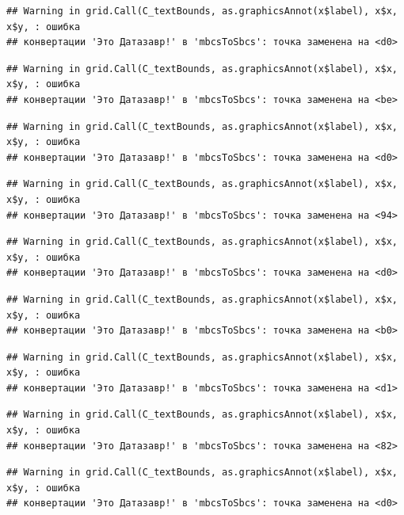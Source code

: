 \documentclass[]{book}
\begin{document}
\begin{verbatim}
## Warning in grid.Call(C_textBounds, as.graphicsAnnot(x$label), x$x, x$y, : ошибка
## конвертации 'Это Датазавр!' в 'mbcsToSbcs': точка заменена на <d0>
\end{verbatim}

\begin{verbatim}
## Warning in grid.Call(C_textBounds, as.graphicsAnnot(x$label), x$x, x$y, : ошибка
## конвертации 'Это Датазавр!' в 'mbcsToSbcs': точка заменена на <be>
\end{verbatim}

\begin{verbatim}
## Warning in grid.Call(C_textBounds, as.graphicsAnnot(x$label), x$x, x$y, : ошибка
## конвертации 'Это Датазавр!' в 'mbcsToSbcs': точка заменена на <d0>
\end{verbatim}

\begin{verbatim}
## Warning in grid.Call(C_textBounds, as.graphicsAnnot(x$label), x$x, x$y, : ошибка
## конвертации 'Это Датазавр!' в 'mbcsToSbcs': точка заменена на <94>
\end{verbatim}

\begin{verbatim}
## Warning in grid.Call(C_textBounds, as.graphicsAnnot(x$label), x$x, x$y, : ошибка
## конвертации 'Это Датазавр!' в 'mbcsToSbcs': точка заменена на <d0>
\end{verbatim}

\begin{verbatim}
## Warning in grid.Call(C_textBounds, as.graphicsAnnot(x$label), x$x, x$y, : ошибка
## конвертации 'Это Датазавр!' в 'mbcsToSbcs': точка заменена на <b0>
\end{verbatim}

\begin{verbatim}
## Warning in grid.Call(C_textBounds, as.graphicsAnnot(x$label), x$x, x$y, : ошибка
## конвертации 'Это Датазавр!' в 'mbcsToSbcs': точка заменена на <d1>
\end{verbatim}

\begin{verbatim}
## Warning in grid.Call(C_textBounds, as.graphicsAnnot(x$label), x$x, x$y, : ошибка
## конвертации 'Это Датазавр!' в 'mbcsToSbcs': точка заменена на <82>
\end{verbatim}

\begin{verbatim}
## Warning in grid.Call(C_textBounds, as.graphicsAnnot(x$label), x$x, x$y, : ошибка
## конвертации 'Это Датазавр!' в 'mbcsToSbcs': точка заменена на <d0>
\end{verbatim}
\end{document}
